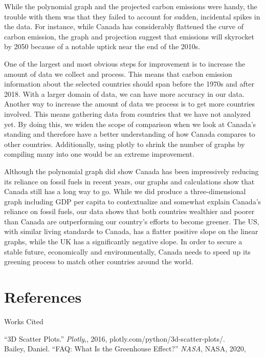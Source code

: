 \documentclass[fontsize=11pt]{article}
\begin{document}
    While the polynomial graph and the projected carbon emissions were handy, the trouble with them was that they failed to account for sudden, incidental spikes in the data. For instance, while Canada has considerably flattened the curve of carbon emission, the graph and projection suggest that emissions will skyrocket by 2050 because of a notable uptick near the end of the 2010s.

    One of the largest and most obvious steps for improvement is to increase the amount of data we collect and process. This means that carbon emission information about the selected countries should span before the 1970s and after 2018. With a larger domain of data, we can have more accuracy in our data. Another way to increase the amount of data we process is to get more countries involved. This means gathering data from countries that we have not analyzed yet. By doing this, we widen the scope of comparison when we look at Canada’s standing and therefore have a better understanding of how Canada compares to other countries. Additionally, using plotly to shrink the number of graphs by compiling many into one would be an extreme improvement.

    Although the polynomial graph did show Canada has been impressively reducing its reliance on fossil fuels in recent years, our graphs and calculations show that Canada still has a long way to go. While we did produce a three-dimensional graph including GDP per capita to contextualize and somewhat explain Canada's reliance on fossil fuels, our data shows that both countries wealthier and poorer than Canada are outperforming our country's efforts to become greener. The US, with similar living standards to Canada, has a flatter positive slope on the linear graphs, while the UK has a significantly negative slope. In order to secure a stable future, economically and environmentally, Canada needs to speed up its greening process to match other countries around the world.
    \section*{References}


    \begin{center}
        Works Cited
    \end{center}
    “3D Scatter Plots.” \textit{Plotly},, 2016, plotly.com/python/3d-scatter-plots/. \\
    \newline
    Bailey, Daniel. “FAQ: What Is the Greenhouse Effect?” \textit{NASA}, NASA, 2020,
    \newline
\end{document}

